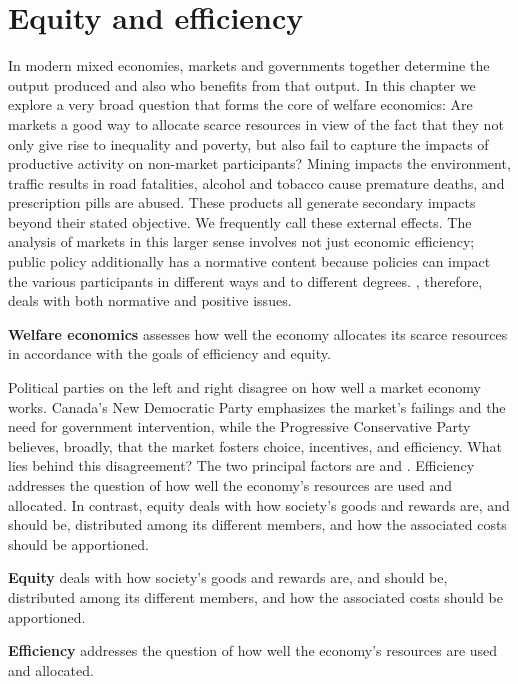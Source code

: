 \section{Equity and efficiency}\label{sec:ch5sec1}

In modern mixed economies, markets and governments together determine the
output produced and also who benefits from that output. In this chapter we
explore a very broad question that forms the core of welfare economics: Are
markets a good way to allocate scarce resources in view of the fact that
they not only give rise to inequality and poverty, but also fail to capture
the impacts of productive activity on non-market participants? Mining
impacts the environment, traffic results in road fatalities, alcohol and
tobacco cause premature deaths, and prescription pills are abused. These
products all generate secondary impacts beyond their stated objective. We
frequently call these external effects. The analysis of markets in this
larger sense involves not just economic efficiency; public policy
additionally has a normative content because policies can impact the various
participants in different ways and to different degrees. %
, therefore, deals with both normative and
positive issues.

\begin{DefBox}
\textbf{Welfare economics} assesses how well the economy allocates its scarce resources in accordance with the goals of efficiency and equity.
\end{DefBox}

\newhtmlpage

Political parties on the left and right disagree on how well a market
economy works. Canada's New Democratic Party emphasizes the market's
failings and the need for government intervention, while the Progressive
Conservative Party believes, broadly, that the market fosters choice,
incentives, and efficiency. What lies behind this disagreement? The two
principal factors are  and .
Efficiency addresses the question of how well the economy's resources are
used and allocated. In contrast, equity deals with how society's goods and
rewards are, and should be, distributed among its different members, and how
the associated costs should be apportioned.

\begin{DefBox}
\textbf{Equity} deals with how society's goods and rewards are, and should be, distributed among its different members, and how the associated costs should be apportioned.

\textbf{Efficiency} addresses the question of how well the economy's resources are used and allocated.
\end{DefBox}

